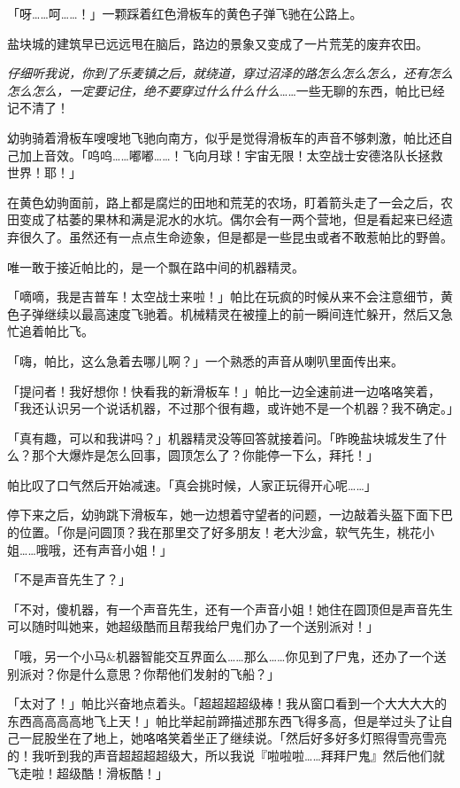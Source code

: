 「呀……呵……！」一颗踩着红色滑板车的黄色子弹飞驰在公路上。

盐块城的建筑早已远远甩在脑后，路边的景象又变成了一片荒芜的废弃农田。

\emph{仔细听我说，你到了乐麦镇之后，就绕道，穿过沼泽的路怎么怎么怎么，还有怎么怎么怎么，一定要记住，绝不要穿过什么什么什么}……一些无聊的东西，帕比已经记不清了！

幼驹骑着滑板车嗖嗖地飞驰向南方，似乎是觉得滑板车的声音不够刺激，帕比还自己加上音效。「呜呜……嘟嘟……！飞向月球！宇宙无限！太空战士安德洛队长拯救世界！耶！」

在黄色幼驹面前，路上都是腐烂的田地和荒芜的农场，盯着箭头走了一会之后，农田变成了枯萎的果林和满是泥水的水坑。偶尔会有一两个营地，但是看起来已经遗弃很久了。虽然还有一点点生命迹象，但是都是一些昆虫或者不敢惹帕比的野兽。

唯一敢于接近帕比的，是一个飘在路中间的机器精灵。

「嘀嘀，我是吉普车！太空战士来啦！」帕比在玩疯的时候从来不会注意细节，黄色子弹继续以最高速度飞驰着。机械精灵在被撞上的前一瞬间连忙躲开，然后又急忙追着帕比飞。

「嗨，帕比，这么急着去哪儿啊？」一个熟悉的声音从喇叭里面传出来。

「提问者！我好想你！快看我的新滑板车！」帕比一边全速前进一边咯咯笑着，「我还认识另一个说话机器，不过那个很有趣，或许她不是一个机器？我不确定。」

「真有趣，可以和我讲吗？」机器精灵没等回答就接着问。「昨晚盐块城发生了什么？那个大爆炸是怎么回事，圆顶怎么了？你能停一下么，拜托！」

帕比叹了口气然后开始减速。「真会挑时候，人家正玩得开心呢……」

停下来之后，幼驹跳下滑板车，她一边想着守望者的问题，一边敲着头盔下面下巴的位置。「你是问圆顶？我在那里交了好多朋友！老大沙盒，软气先生，桃花小姐……哦哦，还有声音小姐！」

「不是声音先生了？」

「不对，傻机器，有一个声音先生，还有一个声音小姐！她住在圆顶但是声音先生可以随时叫她来，她超级酷而且帮我给尸鬼们办了一个送别派对！」

「哦，另一个小马\&机器智能交互界面么……那么……你见到了尸鬼，还办了一个送别派对？你是什么意思？你帮他们发射的飞船？」

「太对了！」帕比兴奋地点着头。「超超超超级棒！我从窗口看到一个大大大大的东西高高高高地飞上天！」帕比举起前蹄描述那东西飞得多高，但是举过头了让自己一屁股坐在了地上，她咯咯笑着坐正了继续说。「然后好多好多灯照得雪亮雪亮的！我听到我的声音超超超超级大，所以我说『啦啦啦……拜拜尸鬼』然后他们就飞走啦！超级酷！滑板酷！」


